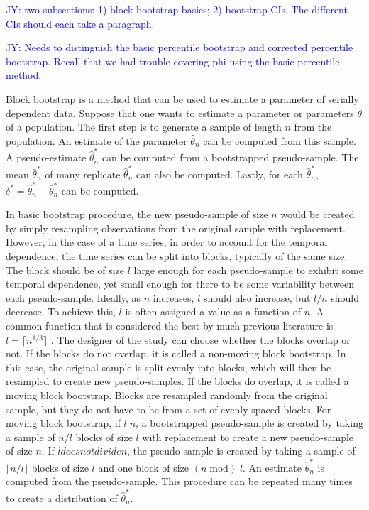 \documentclass[12pt, letterpaper, titlepage]{article}
\newcommand{\jy}[1]{\textcolor{blue}{JY: #1}}
\begin{document}
\jy{two subsections: 1) block bootstrap basics; 2) bootstrap CIs. The different
  CIs should each take a paragraph.}

\jy{Needs to distinguish the basic percentile bootstrap and corrected percentile
  bootstrap. Recall that we had trouble covering phi using the basic percentile
  method.}


Block bootstrap is a method that can be used to estimate a parameter of
serially dependent data. Suppose that one wants to estimate a parameter or
parameters $\theta$ of a population. The first step is to generate a sample of
length $n$ from the population. An estimate of the parameter
$\hat{\theta}_{n}$ can be computed from this sample. A pseudo-estimate
$\hat\theta_n^*$ can be computed from a bootstrapped pseudo-sample. The mean
$\bar\theta_n^*$ of many replicate $\hat\theta_n^*$ can also be computed.
Lastly, for each $\hat\theta_n^*$, $\delta^* = \hat\theta_n^* -
\bar\theta_n^*$ can be computed.


In basic bootstrap procedure, the new pseudo-sample of size $n$ would be
created by simply resampling observations from the original sample with
replacement. However, in the case of a time series, in order to account for
the temporal dependence, the time series can be split into blocks, typically
of the same size. The block should be of size $l$ large enough for each
pseudo-sample to exhibit some temporal dependence, yet small enough for there
to be some variability between each pseudo-sample. Ideally, as $n$ increases,
$l$ should also increase, but $l / n$ should decrease. To achieve this, $l$ is
often assigned a value as a function of $n$. A common function that is
considered the best by much previous literature is $l = \lceil n^{1/3} \rceil$
\citep{buhlmann1999block}. The designer of the study can choose whether the
blocks overlap or not. If the blocks do not overlap, it is called a non-moving
block bootstrap. In this case, the original sample is split evenly into
blocks, which will then be resampled to create new pseudo-samples. If the
blocks do overlap, it is called a moving block bootstrap. Blocks are resampled
randomly from the original sample, but they do not have to be from a set of
evenly spaced blocks. For moving block bootstrap, if $l \vert n$, a
bootstrapped pseudo-sample is created by taking a sample of $n / l$ blocks of
size $l$ with replacement to create a new pseudo-sample of size $n$. If
$l does not divide n$, the pseudo-sample is created by taking a sample of
$\lfloor n / l \rfloor$ blocks of size $l$ and one block of size
$(n \;\mathrm{mod})\; l$. An estimate $\hat\theta_n^*$ is computed from the
pseudo-sample. This procedure can be repeated many times to create a
distribution of $\hat\theta_n^*$. 
\end{document}

